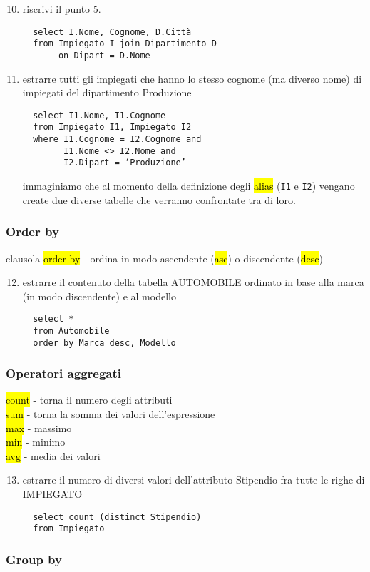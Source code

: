 \documentclass[a4paper]{article}
\begin{document}
\begin{enumerate}
  \setcounter{enumi}{9}
  \item riscrivi il punto 5.
  \begin{verbatim}
  select I.Nome, Cognome, D.Città
  from Impiegato I join Dipartimento D
       on Dipart = D.Nome
  \end{verbatim}\par   \item estrarre tutti gli impiegati che hanno lo stesso cognome (ma diverso nome) di impiegati del dipartimento Produzione
  \begin{verbatim}
  select I1.Nome, I1.Cognome
  from Impiegato I1, Impiegato I2
  where I1.Cognome = I2.Cognome and
        I1.Nome <> I2.Nome and
        I2.Dipart = ‘Produzione’
  \end{verbatim}
  immaginiamo che al momento della definizione degli \hl{alias} (\texttt{I1} e \texttt{I2}) vengano create due diverse tabelle che verranno confrontate tra di loro.
\end{enumerate}\par \subsubsection{Order by}
clausola \hl{order by} - ordina in modo ascendente (\hl{asc}) o discendente (\hl{desc})
\begin{enumerate}
  \setcounter{enumi}{11}
  \item estrarre il contenuto della tabella AUTOMOBILE ordinato in base alla marca (in modo discendente) e al modello
  \begin{verbatim}
  select *
  from Automobile
  order by Marca desc, Modello
  \end{verbatim}
\end{enumerate}\par \subsubsection{Operatori aggregati}
\hl{count} - torna il numero degli attributi\\
\hl{sum} - torna la somma dei valori dell’espressione\\
\hl{max} - massimo\\
\hl{min} - minimo\\
\hl{avg} - media dei valori
\begin{enumerate}
  \setcounter{enumi}{12}
  \item estrarre il numero di diversi valori dell’attributo Stipendio fra tutte le righe di IMPIEGATO
  \begin{verbatim}
  select count (distinct Stipendio)
  from Impiegato
  \end{verbatim}
\end{enumerate}\par \subsubsection{Group by}
\end{document}

